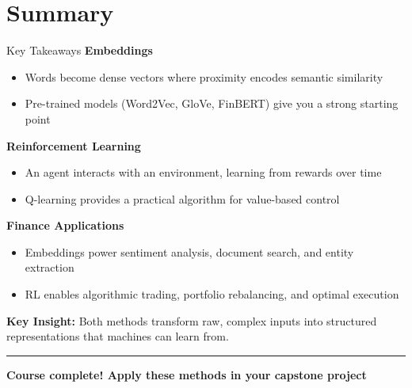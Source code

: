 \documentclass[8pt,aspectratio=169]{beamer}
\newcommand{\bottomnote}[1]{%
\vfill
\vspace{-2mm}
\textcolor{mllavender2}{\rule{\textwidth}{0.4pt}}
\vspace{1mm}
\footnotesize
\textbf{#1}
}
\begin{document}

\section{Summary}

\begin{frame}[t]{Key Takeaways}
\textbf{Embeddings}
\begin{itemize}
\item Words become dense vectors where proximity encodes semantic similarity
\item Pre-trained models (Word2Vec, GloVe, FinBERT) give you a strong starting point
\end{itemize}
\vspace{0.3em}
\textbf{Reinforcement Learning}
\begin{itemize}
\item An agent interacts with an environment, learning from rewards over time
\item Q-learning provides a practical algorithm for value-based control
\end{itemize}
\vspace{0.3em}
\textbf{Finance Applications}
\begin{itemize}
\item Embeddings power sentiment analysis, document search, and entity extraction
\item RL enables algorithmic trading, portfolio rebalancing, and optimal execution
\end{itemize}
\vspace{0.3em}
\textbf{Key Insight:} Both methods transform raw, complex inputs into structured representations that machines can learn from.
\bottomnote{Course complete! Apply these methods in your capstone project}
\end{frame}
\end{document}
